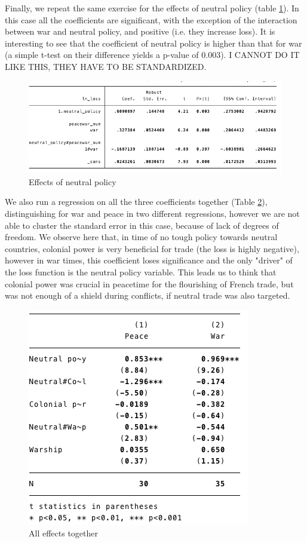 \documentclass[12pt,a4paper,notitlepage,english]{article}
\begin{document}
Finally, we repeat the same exercise for the effects of neutral policy (table \ref{effects_neutral_policy}). In this case all the coefficients are significant, with the exception of the interaction between war and neutral policy, and positive (i.e. they increase loss). It is interesting to see that the coefficient of neutral policy is higher than that for war (a simple t-test on their difference yields a p-value of 0.003). I CANNOT DO IT LIKE THIS, THEY HAVE TO BE STANDARDIZED. \\
\begin{figure}
\centering
\caption{Effects of neutral policy}
\label{effects_neutral_policy}
\includegraphics[scale=.65]{reg3}
\end{figure}
We also run a regression on all the three coefficients together (Table \ref{effects_together}), distinguishing for war and peace in two different regressions, however we are not able to cluster the standard error in this case, because of lack of degrees of freedom. We observe here that, in time of no tough policy towards neutral countries, colonial power is very beneficial for trade (the loss is highly negative), however in war times, this coefficient loses significance and the only "driver" of the loss function is the neutral policy variable. This leads us to think that colonial power was crucial in peacetime for the flourishing of French trade, but was not enough of a shield during conflicts, if neutral trade was also targeted. 
\begin{figure}
\centering
\caption{All effects together}
\label{effects_together}
\includegraphics[scale=.8]{reg4}
\end{figure}
\end{document}
